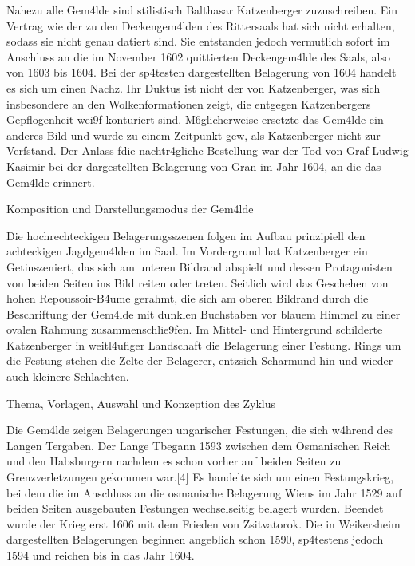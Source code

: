 \documentclass[
  letterpaper,
]{book}
\begin{document}
Nahezu alle Gem\xa4lde sind stilistisch Balthasar Katzenberger
zuzuschreiben. Ein Vertrag wie der zu den Deckengem\xa4lden des
Rittersaals hat sich nicht erhalten, sodass sie nicht genau datiert
sind. Sie entstanden jedoch vermutlich sofort im Anschluss an die im
November 1602 quittierten Deckengem\xa4lde des Saals, also von 1603
bis 1604. Bei der sp\xa4testen dargestellten Belagerung von 1604
handelt es sich um einen Nachz\xbcgler. Ihr Duktus ist nicht der von
Katzenberger, was sich insbesondere an den Wolkenformationen zeigt, die
entgegen Katzenbergers Gepflogenheit wei\x9f konturiert sind.
M\xb6glicherweise ersetzte das Gem\xa4lde ein anderes Bild und
wurde zu einem Zeitpunkt gew\xbcnscht, als Katzenberger nicht zur
Verf\xbcgung stand. Der Anlass f\xbcr die nachtr\xa4gliche
Bestellung war der Tod von Graf Ludwig Kasimir bei der dargestellten
Belagerung von Gran im Jahr 1604, an die das Gem\xa4lde erinnert.

Komposition und Darstellungsmodus der Gem\xa4lde

Die hochrechteckigen Belagerungsszenen folgen im Aufbau prinzipiell den
achteckigen Jagdgem\xa4lden im Saal. Im Vordergrund hat Katzenberger
ein Get\xbcmmel inszeniert, das sich am unteren Bildrand abspielt
und dessen Protagonisten von beiden Seiten ins Bild reiten oder treten.
Seitlich wird das Geschehen von hohen Repoussoir-B\xa4ume gerahmt,
die sich am oberen Bildrand durch die Beschriftung der Gem\xa4lde
mit dunklen Buchstaben vor blauem Himmel zu einer ovalen Rahmung
zusammenschlie\x9fen. Im Mittel- und Hintergrund schilderte
Katzenberger in weitl\xa4ufiger Landschaft die Belagerung einer
Festung. Rings um die Festung stehen die Zelte der Belagerer,
entz\xbcnden sich Scharm\xbctzel und hin und wieder auch
kleinere Schlachten.

Thema, Vorlagen, Auswahl und Konzeption des Zyklus

Die Gem\xa4lde zeigen Belagerungen ungarischer Festungen, die sich
w\xa4hrend des Langen T\xbcrkenkriegs ergaben. Der Lange
T\xbcrkenkrieg begann 1593 zwischen dem Osmanischen Reich und den
Habsburgern nachdem es schon vorher auf beiden Seiten zu
Grenzverletzungen gekommen war.{[}4{]} Es handelte sich um einen
Festungskrieg, bei dem die im Anschluss an die osmanische Belagerung
Wiens im Jahr 1529 auf beiden Seiten ausgebauten Festungen wechselseitig
belagert wurden. Beendet wurde der Krieg erst 1606 mit dem Frieden von
Zsitvatorok. Die in Weikersheim dargestellten Belagerungen beginnen
angeblich schon 1590, sp\xa4testens jedoch 1594 und reichen bis in
das Jahr 1604.
\end{document}
